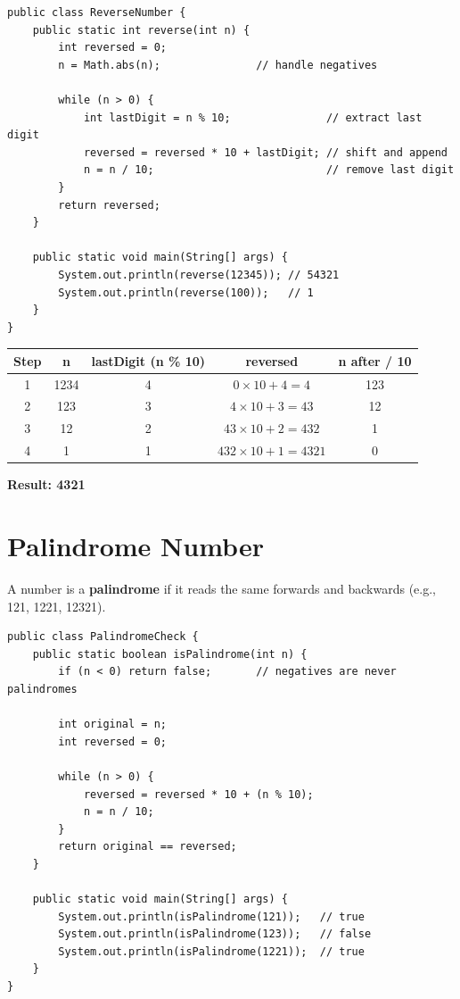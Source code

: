 \documentclass[12pt,a4paper,oneside]{book}
\begin{document}
\begin{lstlisting}[caption={Reverse a Number}]
public class ReverseNumber {
    public static int reverse(int n) {
        int reversed = 0;
        n = Math.abs(n);               // handle negatives

        while (n > 0) {
            int lastDigit = n % 10;               // extract last digit
            reversed = reversed * 10 + lastDigit; // shift and append
            n = n / 10;                           // remove last digit
        }
        return reversed;
    }

    public static void main(String[] args) {
        System.out.println(reverse(12345)); // 54321
        System.out.println(reverse(100));   // 1
    }
}
\end{lstlisting}

\begin{dryrun}
\begin{center}
\begin{tabular}{ccccc}
\toprule
\textbf{Step} & \textbf{n} & \textbf{lastDigit (n \% 10)} & \textbf{reversed} & \textbf{n after / 10}\\
\midrule
1 & 1234 & 4 & $0 \times 10 + 4 = 4$    & 123\\
2 & 123  & 3 & $4 \times 10 + 3 = 43$   & 12\\
3 & 12   & 2 & $43 \times 10 + 2 = 432$ & 1\\
4 & 1    & 1 & $432 \times 10 + 1 = 4321$ & 0\\
\bottomrule
\end{tabular}
\end{center}
\textbf{Result: 4321}
\end{dryrun}

\section{Palindrome Number}

A number is a \textbf{palindrome} if it reads the same forwards and backwards (e.g., 121, 1221, 12321).

\begin{lstlisting}[caption={Check Palindrome Number}]
public class PalindromeCheck {
    public static boolean isPalindrome(int n) {
        if (n < 0) return false;       // negatives are never palindromes

        int original = n;
        int reversed = 0;

        while (n > 0) {
            reversed = reversed * 10 + (n % 10);
            n = n / 10;
        }
        return original == reversed;
    }

    public static void main(String[] args) {
        System.out.println(isPalindrome(121));   // true
        System.out.println(isPalindrome(123));   // false
        System.out.println(isPalindrome(1221));  // true
    }
}
\end{lstlisting}
\end{document}
